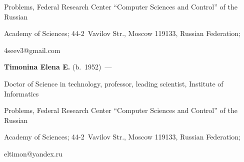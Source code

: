 Problems, Federal Research Center ``Computer Sciences and Control'' of the Russian 


Academy of Sciences; 44-2~Vavilov Str., Moscow 119133, Russian Federation; 


\mbox{4seev3@gmail.com} 





\vspace*{3pt}





\noindent


\textbf{Timonina Elena E.} (b.\ 1952)~---


Doctor of Science in technology, professor, leading scientist, Institute of Informatics 


Problems, Federal Research Center ``Computer Sciences and Control'' of the Russian 


Academy of Sciences; 44-2~Vavilov Str., Moscow 119133, Russian Federation; 


\mbox{eltimon@yandex.ru} 





\label{end\stat}








\renewcommand{\bibname}{\protect\rm Литература}


